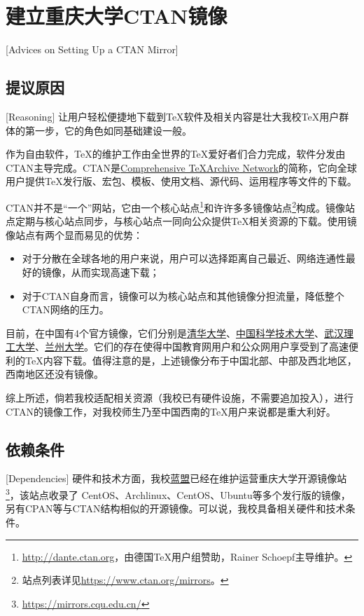 \section{建立重庆大学CTAN镜像}[Advices on Setting Up a CTAN Mirror]\label{sec:ctanMirror}
\subsection{提议原因}[Reasoning]
让用户轻松便捷地下载到\TeX 软件及相关内容是壮大我校\TeX 用户群体的第一步，它的角色如同基础建设一般。

作为自由软件，\TeX 的维护工作由全世界的\TeX 爱好者们合力完成，软件分发由CTAN主导完成。CTAN是\href{https://www.ctan.org/}{Comprehensive \TeX Archive Network}的简称，它向全球用户提供\TeX 发行版、宏包、模板、使用文档、源代码、运用程序等文件的下载。

CTAN并不是“一个”网站，它由一个核心站点\footnote{\url{http://dante.ctan.org}，由德国\TeX 用户组赞助，Rainer Schoepf主导维护。}和许许多多镜像站点\footnote{站点列表详见\url{https://www.ctan.org/mirrors}。}构成。镜像站点定期与核心站点同步，与核心站点一同向公众提供\TeX 相关资源的下载。使用镜像站点有两个显而易见的优势：

\begin{itemize}
	\item 对于分散在全球各地的用户来说，用户可以选择距离自己最近、网络连通性最好的镜像，从而实现高速下载；
	\item 对于CTAN自身而言，镜像可以为核心站点和其他镜像分担流量，降低整个CTAN网络的压力。
\end{itemize}

目前，在中国有4个官方镜像，它们分别是\href{http://mirrors.tuna.tsinghua.edu.cn/CTAN/}{清华大学}、\href{http://mirrors.ustc.edu.cn/CTAN/}{中国科学技术大学}、\href{http://mirrors.hust.edu.cn/CTAN/}{武汉理工大学}、\href{http://mirror.lzu.edu.cn/CTAN/}{兰州大学}。它们的存在使得中国教育网用户和公众网用户享受到了高速便利的\TeX 内容下载。值得注意的是，上述镜像分布于中国北部、中部及西北地区，西南地区还没有镜像。

综上所述，倘若我校适配相关资源（我校已有硬件设施，不需要追加投入），进行CTAN的镜像工作，对我校师生乃至中国西南的\TeX 用户来说都是重大利好。

\subsection{依赖条件}[Dependencies]
硬件和技术方面，我校\href{http://lanunion.cqu.edu.cn/}{蓝盟}已经在维护运营重庆大学开源镜像站\footnote{\url{https://mirrors.cqu.edu.cn/}}，该站点收录了 CentOS、Archlinux、CentOS、Ubuntu等多个发行版的镜像，另有CPAN等与CTAN结构相似的开源镜像。可以说，我校具备相关硬件和技术条件。

